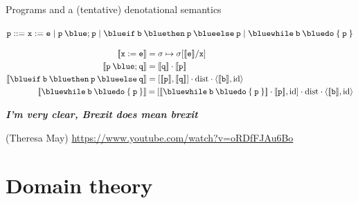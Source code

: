 \documentclass{beamer}
\begin{document}
\begin{frame}{Programs and a (tentative) denotational semantics}
        \begin{block}{\vspace*{-3.5ex}}
        \begin{center}
        $\prog{p} ::= \mathtt{x} := \mathtt{e} \mid
	\mathtt{p \> {\blue ;} \> p} \mid
	\mathtt{{\blue if} \> b \> {\blue then} \> p \> {\blue else} \> p} \mid
	\mathtt{{\blue while} \> b \> {\blue do} \> \{ \> p \> \}}$
        \end{center}
	\end{block}
        \vspace{-0.5cm}
        \begin{align*}
                \sem{\prog{x : = e}} & = \sigma \mapsto \sigma[\sem{\prog{e}}/\prog{x}] \\
                \sem{\prog{p} \> {\blue ;} \> \prog{q}} & 
                = \sem{\prog{q}} \comp \sem{\prog{p}} \\
                \sem{\mathtt{{\blue if} \> b \> {\blue then} \> p \> {\blue else} \> q}}
                                                        & 
                                                        = [\sem{\prog{p}},\sem{\prog{q}}] \comp
                                                        \mathrm{dist} \comp \pv{\sem{\prog{b}}}{\id}
                \\
                \sem{\mathtt{{\blue while} \> b \> {\blue do} \> \{ \> p \> \}} }
                                                        & \> {=} \>
                [\sem{\mathtt{{\blue while} \> b \> {\blue do} \> \{ \> p \> \}} } \comp 
                \sem{\prog{p}},\id] \comp
                \mathrm{dist} \comp \pv{\sem{\prog{b}}}{\id}
        \end{align*}

        \pause
        \smallskip
        \begin{flushright}
        \emph{\textbf{I'm very clear, Brexit does mean brexit}}

        \scriptsize{(Theresa May) \url{https://www.youtube.com/watch?v=oRDfFJAu6Bo}}
        \end{flushright}
\end{frame}

\section{Domain theory}
\end{document}
